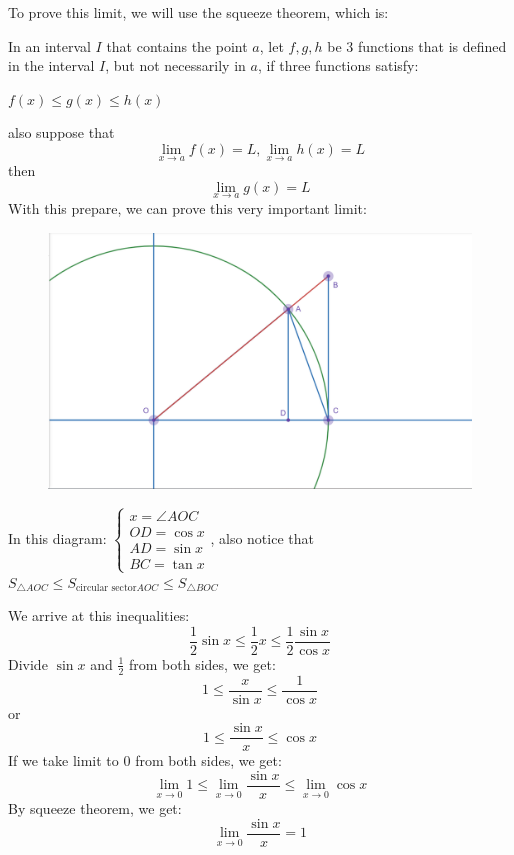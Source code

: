\documentclass{article}
\begin{document}
To prove this limit, we will use the squeeze theorem, which is:
\begin{center}
    In an interval $I$ that contains the point $a$, let $f, g, h$ be 3 functions that is defined in the interval $I$, but not necessarily in $a$, if three functions satisfy:

    $f(x) \leq g(x) \leq h(x)$
\end{center}
also suppose that
    \[
    \lim_{x\to a} f(x) = L, \lim_{x\to a} h(x) = L
    \]
then
    \[
    \lim_{x\to a } g(x) = L
    \]
\newpage
With this prepare, we can prove this very important limit:
\begin{figure}[H]
    \centering
    \includegraphics[width = 12cm]{pictures/triglimit2.png}
\end{figure}
In this diagram:
$\begin{cases}
    x = \angle AOC\\
    OD = \cos x\\
    AD = \sin x\\
    BC = \tan x 
\end{cases}$, also notice that $S_{\triangle AOC} \leq S_{\text{circular sector} AOC} \leq S_{\triangle BOC}$

We arrive at this inequalities:
\begin{equation}
    \frac{1}{2}\sin x \leq \frac{1}{2} x \leq \frac{1}{2}\frac{\sin x}{\cos x}
\end{equation}
Divide $\sin x$ and $\frac{1}{2}$ from both sides, we get:
\[
    1 \leq \frac{x}{\sin x} \leq \frac{1}{\cos x}
\]
or 
\[
    1 \leq \frac{\sin x}{x} \leq \cos x
\]
If we take limit to 0 from both sides, we get:
\[
    \lim_{x\to 0} 1 \leq \lim_{x\to 0}\frac{\sin x}{x} \leq \lim_{x\to 0} \cos x
\]
By squeeze theorem, we get:
\begin{equation}
    \lim_{x\to 0} \frac{\sin x }{x} = 1
\end{equation}
\end{document}
